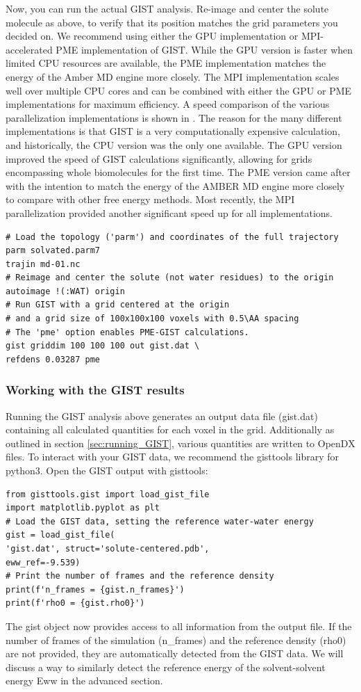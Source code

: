 \documentclass[9pt,tutorial,pubversion]{livecoms}
\begin{document}
Now, you can run the actual GIST analysis.
Re-image and center the solute molecule as above, to verify that its position matches the grid parameters you decided on.
We recommend using either the GPU implementation or MPI-accelerated PME implementation of GIST.
While the GPU version is faster when limited CPU resources are available, the PME implementation matches the energy of the Amber MD engine more closely.
The MPI implementation \cite{Roe2023-mpi-gist} scales well over multiple CPU cores and can be combined with either the GPU or PME implementations for maximum efficiency. 
A speed comparison of the various parallelization implementations is shown in \cite{Roe2023-mpi-gist}.
The reason for the many different implementations is that GIST is a very computationally expensive calculation, and historically, the CPU version was the only one available.
The GPU version improved the speed of GIST calculations significantly, allowing for grids encompassing whole biomolecules for the first time.
The PME version came after with the intention to match the energy of the AMBER MD engine more closely to compare with other free energy methods.
Most recently, the MPI parallelization provided another significant speed up for all implementations.

\begin{lstlisting}[style=cpptraj]
# Load the topology ('parm') and coordinates of the full trajectory
parm solvated.parm7
trajin md-01.nc
# Reimage and center the solute (not water residues) to the origin
autoimage !(:WAT) origin
# Run GIST with a grid centered at the origin
# and a grid size of 100x100x100 voxels with 0.5\AA spacing
# The 'pme' option enables PME-GIST calculations.
gist griddim 100 100 100 out gist.dat \
refdens 0.03287 pme
\end{lstlisting}
\subsubsection{Working with the GIST results}
Running the GIST analysis above generates an output data file (gist.dat) containing all calculated quantities for each voxel in the grid. 
Additionally as outlined in section \ref{sec:running_GIST}, various quantities are written to OpenDX files.
To interact with your GIST data, we recommend the gisttools library for python3. Open the GIST output with gisttools:
\begin{lstlisting}[style=python]
from gisttools.gist import load_gist_file
import matplotlib.pyplot as plt
# Load the GIST data, setting the reference water-water energy
gist = load_gist_file(
'gist.dat', struct='solute-centered.pdb',  
eww_ref=-9.539)
# Print the number of frames and the reference density
print(f'n_frames = {gist.n_frames}')
print(f'rho0 = {gist.rho0}')
\end{lstlisting}
The gist object now provides access to all information from the output file. 
If the number of frames of the simulation (n\_frames) and the reference density (rho0) are not provided, they are automatically detected from the GIST data. 
We will discuss a way to similarly detect the reference energy of the solvent-solvent energy Eww in the advanced section.
\end{document}
